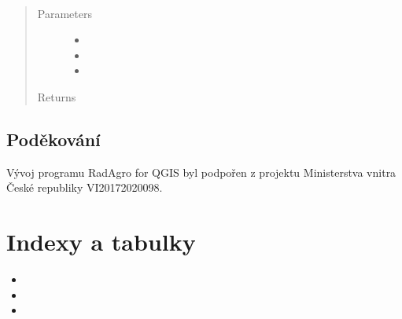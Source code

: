 \documentclass[letterpaper,10pt,english]{sphinxmanual}
\begin{document}
\begin{fulllineitems}
\begin{fulllineitems}
\end{fulllineitems}


\begin{fulllineitems}
\label{\detokenize{libs:sowing_proc.SowingProcTimeSeries.predictSowingProc}}~\begin{quote}\begin{description}
\item[{Parameters}] \leavevmode\begin{itemize}
\item {} 
 \textendash{} 

\item {} 
 \textendash{} 

\item {} 
 \textendash{} 

\end{itemize}

\item[{Returns}] \leavevmode


\end{description}\end{quote}

\end{fulllineitems}


\end{fulllineitems}



\section{Poděkování}
\label{\detokenize{ackn:podekovani}}\label{\detokenize{ackn::doc}}
Vývoj programu RadAgro for QGIS byl podpořen z projektu Ministerstva  vnitra
České republiky VI20172020098.

\noindent{}


\chapter{Indexy a tabulky}
\label{\detokenize{index:indexy-a-tabulky}}\begin{itemize}
\item {} 

\item {} 

\item {} 

\end{itemize}
\end{document}
